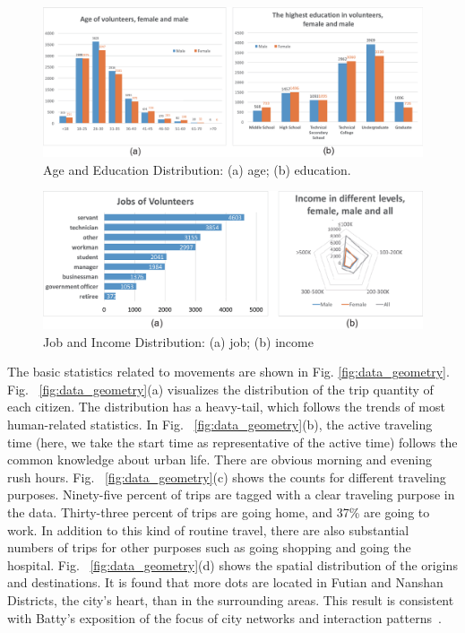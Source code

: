 \documentclass{ieeeaccess}
\begin{document}
\begin{figure}[htb!]
 \centering %
 \includegraphics[width=\columnwidth]{pictures/data1}
 \caption{Age and Education Distribution: (a) age; (b) education.}
 \label{fig:data_age_edu}
\end{figure}


\begin{figure}[htb!]
 \centering %
 \includegraphics[width=\columnwidth]{pictures/data2}
 \caption{Job and Income Distribution: (a) job; (b) income}
 \label{fig:data_job_inc}
\end{figure}
\fi

The basic statistics related to movements are shown in Fig. \ref{fig:data_geometry}. Fig. ~\ref{fig:data_geometry}(a) visualizes the distribution of the trip quantity of each citizen. The distribution has a heavy-tail, which follows the trends of most human-related statistics. In Fig. ~\ref{fig:data_geometry}(b), the active traveling time (here, we take the start time as representative of the active time) follows the common knowledge about urban life. There are obvious morning and evening rush hours. Fig. ~\ref{fig:data_geometry}(c) shows the counts for different traveling purposes. Ninety-five percent of trips are tagged with a clear traveling purpose in the data. Thirty-three percent of trips are going home, and 37\% are going to work. In addition to this kind of routine travel, there are also substantial numbers of trips for other purposes such as going shopping and going the hospital. Fig. ~\ref{fig:data_geometry}(d) shows the spatial distribution of the origins and destinations. It is found that more dots are located in Futian and Nanshan Districts, the city's heart, than in the surrounding areas. This result is consistent with Batty's exposition of the focus of city networks and interaction patterns~\cite{batty2013new}.
\end{document}
